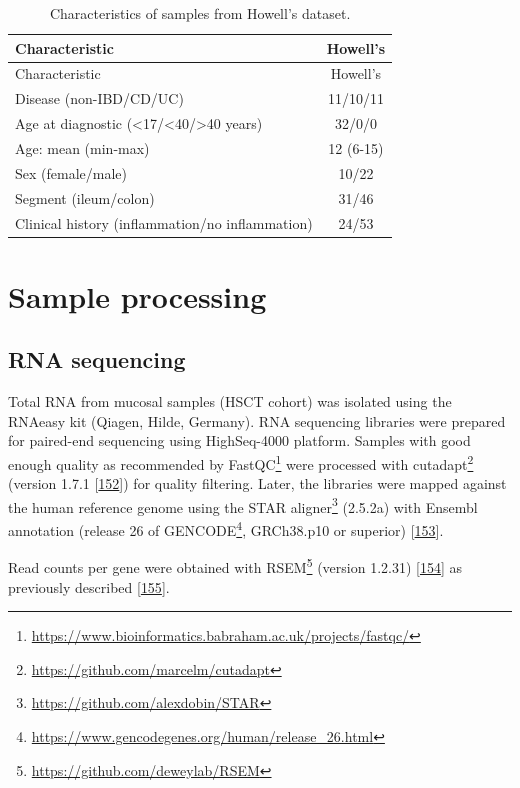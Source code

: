 \documentclass[
  12pt,
  a4paper,
  twoside,
  openright]{book}
\DeclareRobustCommand{\href}[2]{#2\footnote{\url{#1}}}
\begin{document}
\begin{longtable}[]{@{}lc@{}}
\caption{\label{tab:howell} Characteristics of samples from Howell's dataset.}\tabularnewline
\toprule
Characteristic & Howell's \\
\midrule
\endfirsthead
\toprule
Characteristic & Howell's \\
\midrule
\endhead
Disease (non-IBD/CD/UC) & 11/10/11 \\
Age at diagnostic (\textless17/\textless40/\textgreater40 years) & 32/0/0 \\
Age: mean (min-max) & 12 (6-15) \\
Sex (female/male) & 10/22 \\
Segment (ileum/colon) & 31/46 \\
Clinical history (inflammation/no inflammation) & 24/53 \\
\bottomrule
\end{longtable}

\hypertarget{processing}{%
\section{Sample processing}\label{processing}}

\hypertarget{rna-sequencing}{%
\subsection{RNA sequencing}\label{rna-sequencing}}

Total RNA from mucosal samples (HSCT cohort) was isolated using the RNAeasy kit (Qiagen, Hilde, Germany).
RNA sequencing libraries were prepared for paired-end sequencing using HighSeq-4000 platform.
Samples with good enough quality as recommended by \href{https://www.bioinformatics.babraham.ac.uk/projects/fastqc/}{FastQC} were processed with \href{https://github.com/marcelm/cutadapt}{cutadapt} (version 1.7.1 {[}\protect\hyperlink{ref-martin2011}{152}{]}) for quality filtering.
Later, the libraries were mapped against the human reference genome using the \href{https://github.com/alexdobin/STAR}{STAR aligner} (2.5.2a) with Ensembl annotation (\href{https://www.gencodegenes.org/human/release_26.html}{release 26 of GENCODE}, GRCh38.p10 or superior) {[}\protect\hyperlink{ref-dobin2013}{153}{]}.

Read counts per gene were obtained with \href{https://github.com/deweylab/RSEM}{RSEM} (version 1.2.31) {[}\protect\hyperlink{ref-li2011}{154}{]} as previously described {[}\protect\hyperlink{ref-corralizaDifferencesPeripheralTissue}{155}{]}.
\end{document}
